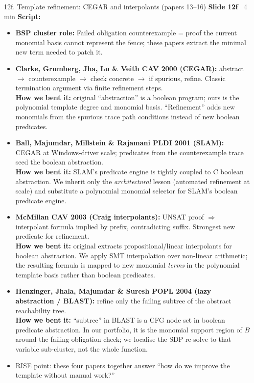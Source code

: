 \documentclass[aspectratio=169]{beamer}
\newcommand{\syncline}[2]{\textbf{#1} \hfill \textcolor{gray}{#2}}
\begin{document}
\begin{frame}[shrink=66]{12f. Template refinement: CEGAR and interpolants (papers 13--16)}
\syncline{Slide 12f}{~4 min}
\textbf{Script:}
\begin{itemize}
  \item \textbf{BSP cluster role:} Failed obligation counterexample = proof the current monomial basis cannot represent the fence; these papers extract the minimal new term needed to patch it.
  \item \textbf{Clarke, Grumberg, Jha, Lu \& Veith CAV 2000 (CEGAR):} abstract \(\rightarrow\) counterexample \(\rightarrow\) check concrete \(\rightarrow\) if spurious, refine. Classic termination argument via finite refinement steps.\\
    \textbf{How we bent it:} original ``abstraction'' is a boolean program; ours is the polynomial template degree and monomial basis. ``Refinement'' adds new monomials from the spurious trace path conditions instead of new boolean predicates.
  \item \textbf{Ball, Majumdar, Millstein \& Rajamani PLDI 2001 (SLAM):} CEGAR at Windows-driver scale; predicates from the counterexample trace seed the boolean abstraction.\\
    \textbf{How we bent it:} SLAM's predicate engine is tightly coupled to C boolean abstraction. We inherit only the \emph{architectural} lesson (automated refinement at scale) and substitute a polynomial monomial selector for SLAM's boolean predicate engine.
  \item \textbf{McMillan CAV 2003 (Craig interpolants):} UNSAT proof \(\Rightarrow\) interpolant formula implied by prefix, contradicting suffix. Strongest new predicate for refinement.\\
    \textbf{How we bent it:} original extracts propositional/linear interpolants for boolean abstraction. We apply SMT interpolation over non-linear arithmetic; the resulting formula is mapped to new monomial \emph{terms} in the polynomial template basis rather than boolean predicates.
  \item \textbf{Henzinger, Jhala, Majumdar \& Suresh POPL 2004 (lazy abstraction / BLAST):} refine only the failing subtree of the abstract reachability tree.\\
    \textbf{How we bent it:} ``subtree'' in BLAST is a CFG node set in boolean predicate abstraction. In our portfolio, it is the monomial support region of \(B\) around the failing obligation check; we localise the SDP re-solve to that variable sub-cluster, not the whole function.
  \item RISE point: these four papers together answer ``how do we improve the template without manual work?''
\end{itemize}
\end{frame}
\end{document}
